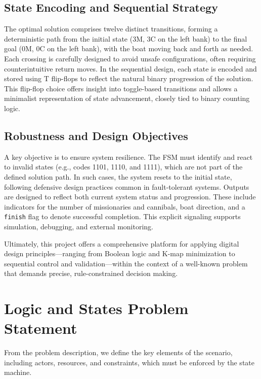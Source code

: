 \documentclass[10pt,a4paper]{article}
\begin{document}
\subsection*{State Encoding and Sequential Strategy}

\noindent The optimal solution comprises twelve distinct transitions, forming a deterministic path from the initial state (3M, 3C on the left bank) to the final goal (0M, 0C on the left bank), with the boat moving back and forth as needed. Each crossing is carefully designed to avoid unsafe configurations, often requiring counterintuitive return moves. In the sequential design, each state is encoded and stored using T flip-flops to reflect the natural binary progression of the solution. This flip-flop choice offers insight into toggle-based transitions and allows a minimalist representation of state advancement, closely tied to binary counting logic.

\subsection*{Robustness and Design Objectives}

\noindent A key objective is to ensure system resilience. The FSM must identify and react to invalid states (e.g., codes 1101, 1110, and 1111), which are not part of the defined solution path. In such cases, the system resets to the initial state, following defensive design practices common in fault-tolerant systems. Outputs are designed to reflect both current system status and progression. These include indicators for the number of missionaries and cannibals, boat direction, and a \texttt{finish} flag to denote successful completion. This explicit signaling supports simulation, debugging, and external monitoring.

\noindent Ultimately, this project offers a comprehensive platform for applying digital design principles—ranging from Boolean logic and K-map minimization to sequential control and validation—within the context of a well-known problem that demands precise, rule-constrained decision making.

\section*{Logic and States Problem Statement}

From the problem description, we define the key elements of the scenario, including actors, resources, and constraints, which must be enforced by the state machine.\\
\end{document}
